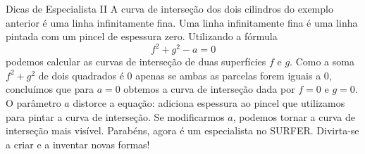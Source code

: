 \begin{surferPage}[Dicas II]{Dicas de Especialista II}
A curva de interse\c c\~ao dos dois cilindros do exemplo anterior \'e uma linha infinitamente fina. Uma linha infinitamente fina \'e uma linha pintada com um pincel de espessura zero. Utilizando a f\'ormula
\[ f^2+g^2-a=0\]
podemos calcular as curvas de interse\c c\~ao de duas superf\'icies $f$ e $g$. Como a soma $f^2+g^2$ de dois quadrados \'e $0$ apenas se ambas as parcelas forem iguais a $0$, conclu\'imos que para $a=0$ obtemos a curva de interse\c c\~ao dada por $f=0$ e $g=0$.
O par\^ametro $a$ distorce a equa\c c\~ao: adiciona espessura ao pincel que utilizamos para pintar a curva de interse\c c\~ao. Se  modificarmos $a$,  podemos tornar a curva de interse\c c\~ao mais vis\'ivel.
\newline \newline
Parab\'ens, agora \'e um especialista no SURFER. Divirta-se a criar e a inventar novas formas!
\end{surferPage}

